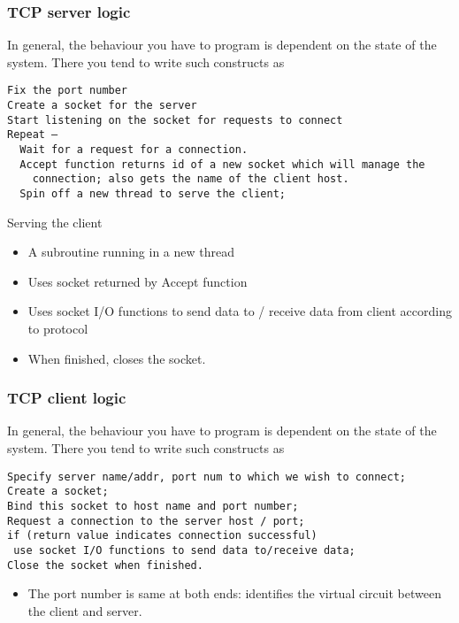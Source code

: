 \documentclass[10pt, hyperref={pdfpagelabels=false}]{beamer}
\begin{document}
\begin{frame} [fragile]
\frametitle{TCP server logic}
In general, the behaviour you have to program is dependent on the state of the system. There you tend to write such constructs as
{\color{blue}
\begin{verbatim}
Fix the port number
Create a socket for the server
Start listening on the socket for requests to connect
Repeat –
  Wait for a request for a connection.
  Accept function returns id of a new socket which will manage the
    connection; also gets the name of the client host.
  Spin off a new thread to serve the client;
\end{verbatim}
}

Serving the client
\begin{itemize}
\item A subroutine running in a new thread
\item Uses socket returned by Accept function
\item Uses socket I/O functions to send data to / receive data from client according to protocol
\item When finished, closes the socket.
\end{itemize}
\end{frame}

\begin{frame} [fragile]
\frametitle{TCP client logic}
In general, the behaviour you have to program is dependent on the state of the system. There you tend to write such constructs as
{\color{blue}
\begin{verbatim}
Specify server name/addr, port num to which we wish to connect;
Create a socket;
Bind this socket to host name and port number;
Request a connection to the server host / port;
if (return value indicates connection successful)
 use socket I/O functions to send data to/receive data;
Close the socket when finished.
\end{verbatim}
}
\begin{itemize}
\item The port number is same at both ends: 
  identifies the virtual circuit between the client and server.
\end{itemize}
\end{frame}
\end{document}
